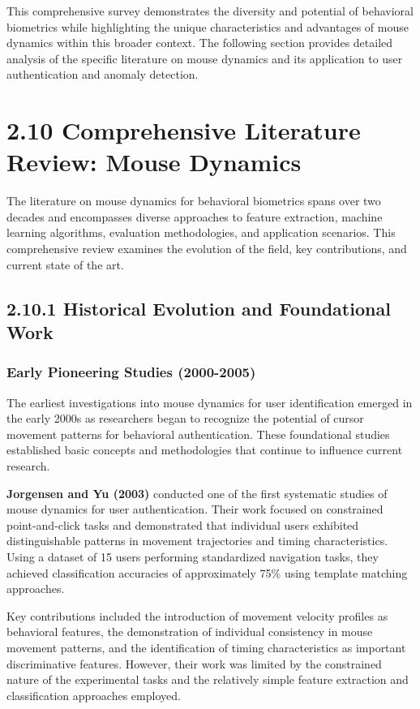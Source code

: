 \documentclass[
  12pt,
  a4paper,
]{report}
\begin{document}
This comprehensive survey demonstrates the diversity and potential of
behavioral biometrics while highlighting the unique characteristics and
advantages of mouse dynamics within this broader context. The following
section provides detailed analysis of the specific literature on mouse
dynamics and its application to user authentication and anomaly
detection.

\section{2.10 Comprehensive Literature Review: Mouse
Dynamics}\label{comprehensive-literature-review-mouse-dynamics}

The literature on mouse dynamics for behavioral biometrics spans over
two decades and encompasses diverse approaches to feature extraction,
machine learning algorithms, evaluation methodologies, and application
scenarios. This comprehensive review examines the evolution of the
field, key contributions, and current state of the art.

\subsection{2.10.1 Historical Evolution and Foundational
Work}\label{historical-evolution-and-foundational-work}

\subsubsection{Early Pioneering Studies
(2000-2005)}\label{early-pioneering-studies-2000-2005}

The earliest investigations into mouse dynamics for user identification
emerged in the early 2000s as researchers began to recognize the
potential of cursor movement patterns for behavioral authentication.
These foundational studies established basic concepts and methodologies
that continue to influence current research.

\textbf{Jorgensen and Yu (2003)} conducted one of the first systematic
studies of mouse dynamics for user authentication. Their work focused on
constrained point-and-click tasks and demonstrated that individual users
exhibited distinguishable patterns in movement trajectories and timing
characteristics. Using a dataset of 15 users performing standardized
navigation tasks, they achieved classification accuracies of
approximately 75\% using template matching approaches.

Key contributions included the introduction of movement velocity
profiles as behavioral features, the demonstration of individual
consistency in mouse movement patterns, and the identification of timing
characteristics as important discriminative features. However, their
work was limited by the constrained nature of the experimental tasks and
the relatively simple feature extraction and classification approaches
employed.
\end{document}
